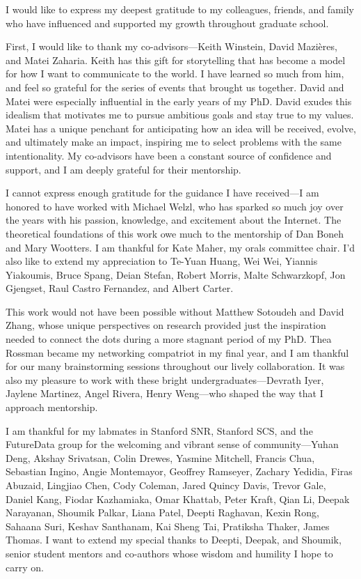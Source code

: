 I would like to express my deepest gratitude to my colleagues, friends, and
family who have influenced and supported my growth throughout graduate school.

First, I would like to thank my co-advisors---Keith Winstein, David Mazières,
and Matei Zaharia. Keith has this gift for storytelling that has become a model
for how I want to communicate to the world. I have learned so much from him,
and feel so grateful for the series of events that brought us together. David
and Matei were especially influential in the early years of my PhD. David
exudes this idealism that motivates me to pursue ambitious goals and stay true
to my values. Matei has a unique penchant for anticipating how an idea will be
received, evolve, and ultimately make an impact, inspiring me to select
problems with the same intentionality. My co-advisors have been a constant
source of confidence and support, and I am deeply grateful for their
mentorship.

I cannot express enough gratitude for the guidance I have received---I am
honored to have worked with Michael Welzl, who has sparked so much joy over the
years with his passion, knowledge, and excitement about the Internet. The
theoretical foundations of this work owe much to the mentorship of Dan Boneh
and Mary Wootters. I am thankful for Kate Maher, my orals
committee chair. I'd also like to extend my appreciation to Te-Yuan Huang, Wei Wei,
Yiannis Yiakoumis, Bruce Spang, Deian Stefan, Robert Morris, Malte Schwarzkopf,
Jon Gjengset, Raul Castro Fernandez, and Albert Carter.

This work would not have been possible without Matthew Sotoudeh and David Zhang,
whose unique perspectives on research provided just the inspiration needed to
connect the dots during a more stagnant period of my PhD. Thea Rossman became
my networking compatriot in my final year, and I am thankful for our many
brainstorming sessions throughout our lively collaboration. It was also my
pleasure to work with these bright undergraduates---Devrath Iyer, Jaylene
Martinez, Angel Rivera, Henry Weng---who shaped the way that I approach
mentorship.

I am thankful for my labmates in Stanford SNR, Stanford SCS, and the FutureData
group for the welcoming and vibrant sense of community---Yuhan Deng, Akshay
Srivatsan, Colin Drewes, Yasmine Mitchell, Francis Chua, Sebastian Ingino,
Angie Montemayor, Geoffrey Ramseyer, Zachary Yedidia, Firas Abuzaid, Lingjiao
Chen, Cody Coleman, Jared Quincy Davis, Trevor Gale, Daniel Kang, Fiodar
Kazhamiaka, Omar Khattab, Peter Kraft, Qian Li, Deepak Narayanan, Shoumik
Palkar, Liana Patel, Deepti Raghavan, Kexin Rong, Sahaana Suri, Keshav
Santhanam, Kai Sheng Tai, Pratiksha Thaker, James Thomas. I want to extend my
special thanks to Deepti, Deepak, and Shoumik, senior student mentors and
co-authors whose wisdom and humility I hope to carry on.

